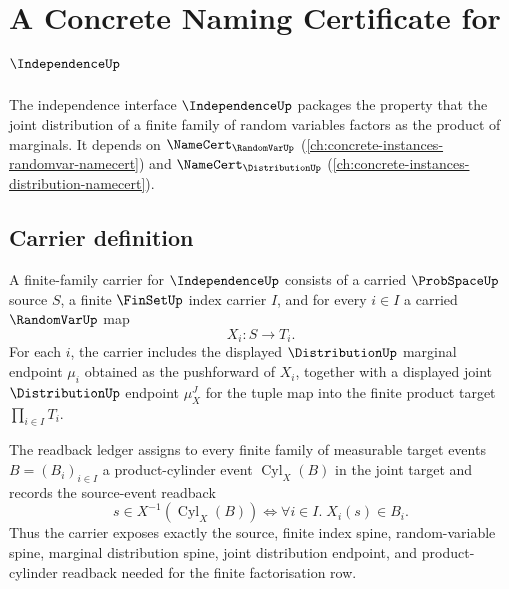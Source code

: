 \chapter{A Concrete Naming Certificate for $\IndependenceUp$}
\label{ch:concrete-instances-independence-namecert}

The independence interface $\IndependenceUp$ packages the property that the joint distribution of a finite family of random variables factors as the product of marginals. It depends on $\NameCert_{\RandomVarUp}$ (\autoref{ch:concrete-instances-randomvar-namecert}) and $\NameCert_{\DistributionUp}$ (\autoref{ch:concrete-instances-distribution-namecert}).

\section{Carrier definition}
\label{sec:independence-carrier}

\begin{definition}
\label{def:independence-finite-family-carrier}
A finite-family carrier for $\IndependenceUp$ consists of a carried $\ProbSpaceUp$ source $S$, a finite $\FinSetUp$ index carrier $I$, and for every $i\in I$ a carried $\RandomVarUp$ map
$$
X_i:S\to T_i.
$$
For each $i$, the carrier includes the displayed $\DistributionUp$ marginal endpoint $\mu_i$ obtained as the pushforward of $X_i$, together with a displayed joint $\DistributionUp$ endpoint $\mu_X^J$ for the tuple map into the finite product target $\prod_{i\in I}T_i$.

The readback ledger assigns to every finite family of measurable target events $B=(B_i)_{i\in I}$ a product-cylinder event $\operatorname{Cyl}_X(B)$ in the joint target and records the source-event readback
$$
s\in X^{-1}(\operatorname{Cyl}_X(B))
\Longleftrightarrow
\forall i\in I.\;X_i(s)\in B_i.
$$
Thus the carrier exposes exactly the source, finite index spine, random-variable spine, marginal distribution spine, joint distribution endpoint, and product-cylinder readback needed for the finite factorisation row.
\end{definition}

